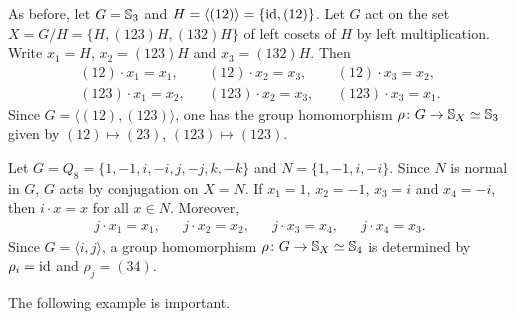 \begin{example}
As before, let $G=\mathbb{S}_3$ and $H=\langle (12)\rangle=\{\operatorname{id},(12)\}$. Let $G$ act on the set $X=G/H=\{H,(123
)H,(132)H\}$ of left cosets of $H$ by left multiplication. Write 
$x_1=H$, $x_2=(123)H$ and $x_3=(132)H$. Then
\begin{align*}
(12)\cdot x_1=x_1,&& (12)\cdot x_2=x_3, && (12)\cdot x_3=x_2,\\
(123)\cdot x_1=x_2, && (123)\cdot x_2=x_3, &&(123)\cdot x_3=x_1.
\end{align*}
Since $G=\langle (12),(123)\rangle$, one has the group
homomorphism 
$\rho\colon G\to\mathbb{S}_{X}\simeq\mathbb{S}_3$ given by $(12)\mapsto (23)$, $(123)\mapsto (123)$.
\end{example}


\begin{example}
Let $G=Q_8=\{1,-1,i,-i,j,-j,k,-k\}$ and $N=\{1,-1,i,-i\}$. Since
$N$ is normal in $G$, $G$
acts by conjugation on $X=N$.
If $x_1=1$, $x_2=-1$, $x_3=i$ and $x_4=-i$, then
$i\cdot x=x$ for all $x\in N$. Moreover, 
\begin{align*}
j\cdot x_1=x_1, && j\cdot x_2=x_2, && j\cdot x_3=x_4, && j\cdot x_4=x_3.
\end{align*}
Since $G=\langle i,j\rangle$, a group homomorphism $\rho\colon G\to\mathbb{S}_X\simeq\mathbb{S}_4$ is determined by 
$\rho_i=\operatorname{id}$ and $\rho_j=(34)$.
\end{example}

The following example is important. 

